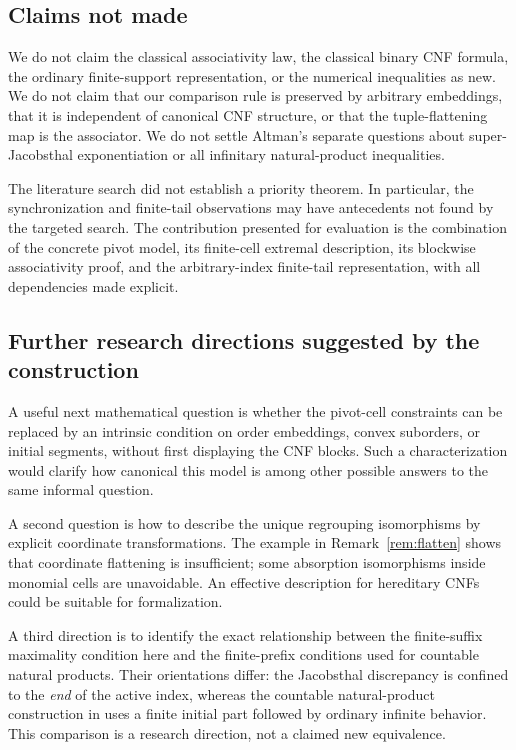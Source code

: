 \documentclass[11pt,letterpaper]{article}
\theoremstyle{definition}
\theoremstyle{remark}
\begin{document}
\subsection{Claims not made}

We do not claim the classical associativity law, the classical binary
CNF formula, the ordinary finite-support representation, or the numerical
inequalities as new. We do not claim that our comparison rule is preserved
by arbitrary embeddings, that it is independent of canonical CNF
structure, or that the tuple-flattening map is the associator.
We do not settle Altman's separate questions about super-Jacobsthal
exponentiation or all infinitary natural-product inequalities.

The literature search did not establish a priority theorem. In
particular, the synchronization and finite-tail observations may have
antecedents not found by the targeted search. The contribution presented
for evaluation is the combination of the concrete pivot model,
its finite-cell extremal description, its blockwise associativity proof,
and the arbitrary-index finite-tail representation, with all dependencies
made explicit.

\subsection{Further research directions suggested by the construction}

A useful next mathematical question is whether the pivot-cell constraints
can be replaced by an intrinsic condition on order embeddings, convex
suborders, or initial segments, without first displaying the CNF blocks.
Such a characterization would clarify how canonical this model is among
other possible answers to the same informal question.

A second question is how to describe the unique regrouping isomorphisms
by explicit coordinate transformations. The example in
Remark~\ref{rem:flatten} shows that coordinate flattening is insufficient;
some absorption isomorphisms inside monomial cells are unavoidable.
An effective description for hereditary CNFs could be suitable for
formalization.

A third direction is to identify the exact relationship between the
finite-suffix maximality condition here and the finite-prefix conditions
used for countable natural products. Their orientations differ: the
Jacobsthal discrepancy is confined to the \emph{end} of the active index,
whereas the countable natural-product construction in
\cite{lip-product} uses a finite initial part followed by ordinary
infinite behavior. This comparison is a research direction, not a claimed
new equivalence.
\end{document}
